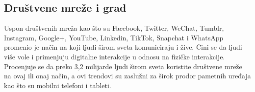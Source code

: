 \documentclass[a0,portrait]{a0poster}
\begin{document}
\begin{multicols}{2}

\color{black}

\section*{\Huge{Društvene mreže i grad}}

\Large{
Uspon društvenih mreža kao što su Facebook, Twitter, WeChat, Tumblr, Instagram, Google+, YouTube, Linkedin, TikTok, Snapchat i WhatsApp promenio je način na koji ljudi širom sveta komuniciraju i žive. Čini se da ljudi više vole i primenjuju digitalne interakcije u odnosu na fizičke interakcije. 
Procenjuje se da preko 3,2 milijarde ljudi širom sveta koristite društvene mreže na ovaj ili onaj način, a ovi trendovi su zaslužni za širok prodor pametnih uređaja kao što su mobilni telefoni i tableti.
}


\end{multicols}
\end{document}

